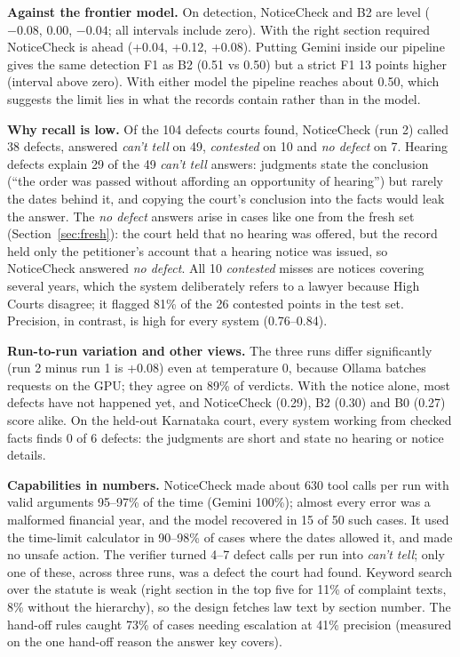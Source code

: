 \documentclass[10pt,a4paper]{article}
\begin{document}
\textbf{Against the frontier model.} On detection, NoticeCheck and B2 are level ($-0.08$, $0.00$, $-0.04$; all intervals include zero). With the right section required NoticeCheck is ahead (+0.04, +0.12, +0.08). Putting Gemini inside our pipeline gives the same detection F1 as B2 (0.51 vs 0.50) but a strict F1 13 points higher (interval above zero). With either model the pipeline reaches about 0.50, which suggests the limit lies in what the records contain rather than in the model.

\textbf{Why recall is low.} Of the 104 defects courts found, NoticeCheck (run 2) called 38 defects, answered \emph{can't tell} on 49, \emph{contested} on 10 and \emph{no defect} on 7. Hearing defects explain 29 of the 49 \emph{can't tell} answers: judgments state the conclusion (``the order was passed without affording an opportunity of hearing'') but rarely the dates behind it, and copying the court's conclusion into the facts would leak the answer. The \emph{no defect} answers arise in cases like one from the fresh set (Section~\ref{sec:fresh}): the court held that no hearing was offered, but the record held only the petitioner's account that a hearing notice was issued, so NoticeCheck answered \emph{no defect}. All 10 \emph{contested} misses are notices covering several years, which the system deliberately refers to a lawyer because High Courts disagree; it flagged 81\% of the 26 contested points in the test set. Precision, in contrast, is high for every system (0.76--0.84).

\textbf{Run-to-run variation and other views.} The three runs differ significantly (run 2 minus run 1 is +0.08) even at temperature 0, because Ollama batches requests on the GPU; they agree on 89\% of verdicts. With the notice alone, most defects have not happened yet, and NoticeCheck (0.29), B2 (0.30) and B0 (0.27) score alike. On the held-out Karnataka court, every system working from checked facts finds 0 of 6 defects: the judgments are short and state no hearing or notice details.

\textbf{Capabilities in numbers.} NoticeCheck made about 630 tool calls per run with valid arguments 95--97\% of the time (Gemini 100\%); almost every error was a malformed financial year, and the model recovered in 15 of 50 such cases. It used the time-limit calculator in 90--98\% of cases where the dates allowed it, and made no unsafe action. The verifier turned 4--7 defect calls per run into \emph{can't tell}; only one of these, across three runs, was a defect the court had found. Keyword search over the statute is weak (right section in the top five for 11\% of complaint texts, 8\% without the hierarchy), so the design fetches law text by section number. The hand-off rules caught 73\% of cases needing escalation at 41\% precision (measured on the one hand-off reason the answer key covers).
\end{document}
